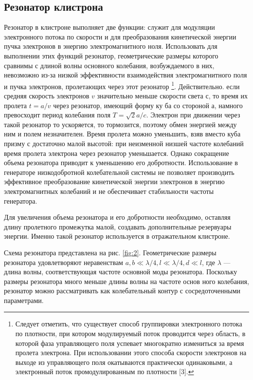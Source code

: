 \subsection{Резонатор клистрона}

Резонатор в клистроне выполняет две функции: служит для модуляции электронного потока по скорости и для преобразования кинетической энергии пучка электронов в энергию электромагнитного ноля. Использовать для выполнении этих функций резонатор, геометрические размеры которого сравнимы с длиной волны основного колебания, возбуждаемого в них, невозможно из-за низкой эффективности взаимодействия электромагнитного поля и пучка электронов, пролетающих через этот резонатор
\footnote{Следует отметить, что существует способ группировки электронного потока по плотности, при котором модулируемый поток проводится через область, в которой фаза управляющего поля успевает многократно измениться за время пролета электрона. При использовании этого способа скорости электронов на выходе из управляющего поля окатываются практически одинаковыми, а электронный поток промодулированным по плотности [3].}. Действительно. если средняя скорость электронов $v$ значительно меньше скорости света $с$, то время их пролета $t = a/v$ через резонатор, имеющий форму ку­ ба со стороной а, намного превосходит период колебания поля $T =\sqrt{2}a/c$. Электрон при движении через такой резонатор то ускоряется, то тормозится, поэтому обмен энергией между ним и полем незначителен. Время пролета можно уменьшить, взяв вместо куба призму с достаточно малой высотой:
при неизменной низшей частоте колебаний время пролета электрона через резонатор уменьшается. Однако сокращение объема резонатора приводит к
уменьшению его добротности. Использование в генераторе низкодобротной колебательной системы не позволяет производить эффективное преобразование кинетической энергии электронов в энергию электромагнитных колебаний и не обеспечивает стабильности частоты генератора.

Для увеличения объема резонатора и его добротности необходимо, оставляя длину пролетного промежутка малой, создавать дополнительные резервуары энергии. Именно такой резонатор используется в отражательном клистроне.

Схема резонатора представлена на рис. \ref{fig:2}. Геометрические размеры резонатора удовлетворяют неравенствам $a,b \ll \lambda /4,l \ll \lambda /4,d \ll l$, где $\lambda$ — длина волны, соответствующая частоте основной моды резонатора. По­скольку размеры резонатора много меньше длины волны на частоте основ­
ного колебания, резонатор можно рассматривать как колебательный контур с сосредоточенными параметрами.

